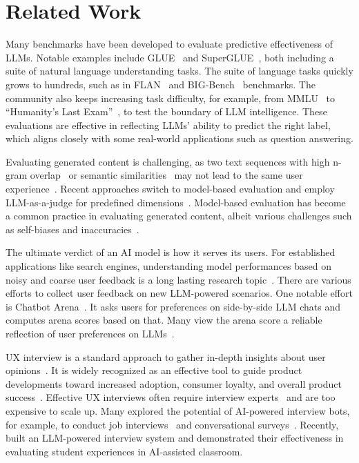 \section{Related Work}

Many benchmarks have been developed to evaluate predictive effectiveness of LLMs. Notable examples include GLUE~\cite{wang2018glue} and SuperGLUE~\cite{wang2019superglue}, both including a suite of natural language understanding tasks.
The suite of language tasks  quickly grows to hundreds, such as in FLAN~\cite{wei2021flan} and BIG-Bench~\cite{bigbench} benchmarks.
The community also keeps increasing task difficulty, for example, from MMLU~\cite{MMLU} to ``Humanity's Last Exam''~\cite{phan2025humanitysexam}, to test the boundary of LLM intelligence.
These evaluations are effective in reflecting LLMs' ability to predict the right label, which aligns closely with some real-world applications such as question answering.

Evaluating generated content is challenging, as two text sequences with high n-gram overlap~\cite{papineni2002bleu} or semantic similarities~\cite{zhang2019bertscore} may not lead to the same user experience~\cite{hanna2021fine}. 
Recent approaches switch to model-based evaluation and employ LLM-as-a-judge for predefined dimensions~\cite{zheng2023judging}.
Model-based evaluation has become a common practice in evaluating generated content, albeit various challenges such as self-biases and inaccuracies~\cite{li2024generation, ye2024justice, wei2024systematic}.

The ultimate verdict of an AI model is how it serves its users. 
For established applications like search engines, 
understanding model performances based on noisy and coarse user feedback is a long lasting research topic~\cite{chuklin2022click}.
There are various efforts to collect user feedback on new LLM-powered scenarios. One notable effort is Chatbot Arena~\cite{chiang2024chatarena}. It asks users for preferences on side-by-side LLM chats and computes arena scores based on that.
Many view the arena score a reliable reflection of user preferences on LLMs~\cite{realiablearena}.

UX interview is a standard approach to gather in-depth insights about user opinions~\cite{rubin2011handbook}. It is widely recognized as an effective tool to guide product developments toward increased adoption, consumer loyalty, and overall product success~\cite{hartson2012ux}.
Effective UX interviews often require interview experts~\cite{uxphd} and are too expensive to scale up.
Many explored the potential of AI-powered interview bots, for example, to conduct job interviews~\cite{li2017confiding} and conversational surveys~\cite{xiao2020tell}. Recently, \citet{li2024lm} built an LLM-powered interview system and demonstrated their effectiveness in evaluating student experiences in AI-assisted classroom.
